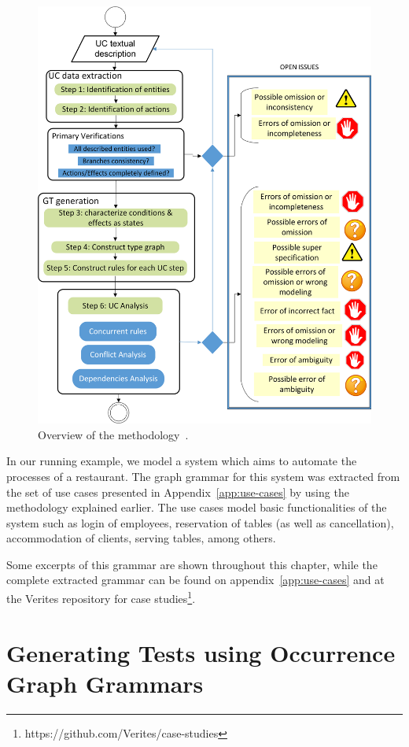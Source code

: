 \begin{figure}[!ht]
  \centering
  \includegraphics[scale=0.7]{images/generating-tests/methodology}
  \caption{Overview of the methodology~\cite{Junior2015}.}\label{fig:tests:methodology}
\end{figure}

In our running example, we model a system which aims to automate the processes of a restaurant. The graph grammar for this system was extracted from the set of use cases presented in Appendix~\ref{app:use-cases} by using the methodology explained earlier. The use cases model basic functionalities of the system such as login of employees, reservation of tables (as well as cancellation), accommodation of clients, serving tables, among others.

Some excerpts of this grammar are shown throughout this chapter, while the complete extracted grammar can be found on appendix~\ref{app:use-cases} and at the Verites repository for case studies\footnote{https://github.com/Verites/case-studies}.

\section{Generating Tests using Occurrence Graph Grammars}


